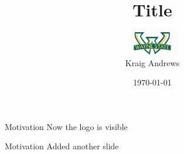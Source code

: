 \documentclass{beamer}
\title{Title}
\author[Kraig Andrews]{\includegraphics[height=1cm,width=2cm]{figs/wsu_logo}\\Kraig Andrews}
\institute[WSU]{Wayne State University}
\date{\today}
\begin{document}
\begin{frame}
\maketitle
\end{frame}


\begin{frame}{Motivation}
Now the logo is visible
\end{frame}

\begin{frame}{Motivation}
Added another slide
\end{frame}
\end{document}
